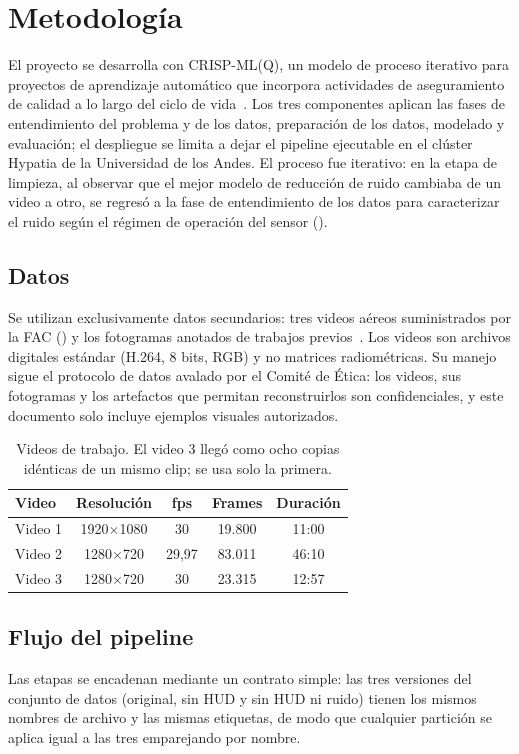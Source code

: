 \section{Metodología}
\label{sec:metodologia}
El proyecto se desarrolla con CRISP-ML(Q), un modelo de proceso iterativo para proyectos de aprendizaje automático que incorpora actividades de aseguramiento de calidad a lo largo del ciclo de vida~\cite{studer2021crispml}. Los tres componentes aplican las fases de entendimiento del problema y de los datos, preparación de los datos, modelado y evaluación; el despliegue se limita a dejar el pipeline ejecutable en el clúster Hypatia de la Universidad de los Andes. El proceso fue iterativo: en la etapa de limpieza, al observar que el mejor modelo de reducción de ruido cambiaba de un video a otro, se regresó a la fase de entendimiento de los datos para caracterizar el ruido según el régimen de operación del sensor ().

\subsection{Datos}
Se utilizan exclusivamente datos secundarios: tres videos aéreos suministrados por la FAC () y los fotogramas anotados de trabajos previos~\cite{acosta2025eyes}. Los videos son archivos digitales estándar (H.264, 8 bits, RGB) y no matrices radiométricas. Su manejo sigue el protocolo de datos avalado por el Comité de Ética: los videos, sus fotogramas y los artefactos que permitan reconstruirlos son confidenciales, y este documento solo incluye ejemplos visuales autorizados.

\begin{table}[H]
\centering
\small
\caption{Videos de trabajo. El video 3 llegó como ocho copias idénticas de un mismo clip; se usa solo la primera.}
\label{tab:videos}
\begin{tabular}{lcccc}
\toprule
\textbf{Video} & \textbf{Resolución} & \textbf{fps} & \textbf{Frames} & \textbf{Duración} \\
\midrule
Video 1 & 1920$\times$1080 & 30 & 19.800 & 11:00 \\
Video 2 & 1280$\times$720 & 29,97 & 83.011 & 46:10 \\
Video 3 & 1280$\times$720 & 30 & 23.315 & 12:57 \\
\bottomrule
\end{tabular}
\end{table}

\subsection{Flujo del pipeline}
Las etapas se encadenan mediante un contrato simple: las tres versiones del conjunto de datos (original, sin HUD y sin HUD ni ruido) tienen los mismos nombres de archivo y las mismas etiquetas, de modo que cualquier partición se aplica igual a las tres emparejando por nombre.


